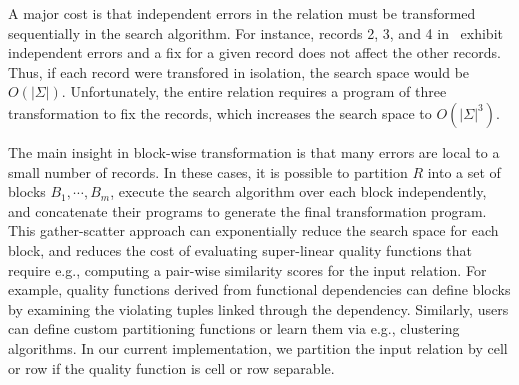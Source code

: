

A major cost is that independent errors in the relation must be transformed sequentially in the search algorithm.  For instance, records 2, 3, and 4 in~ exhibit independent errors and a fix for a given record does not affect the other records.  Thus, if each record were transfored in isolation, the search space would be $O(|\Sigma|)$.  Unfortunately, the entire relation requires a program of three transformation to fix the records, which increases the search space to $O(|\Sigma|^3)$.

The main insight in block-wise transformation is that many errors are local to a small number of records.  In these cases, it is possible to partition $R$ into a set of blocks $B_1,\cdots,B_m$, execute the search algorithm over each block independently, and concatenate their programs to generate the final transformation program.  This gather-scatter approach can exponentially reduce the search space for each block, and reduces the cost of evaluating super-linear quality functions that require e.g., computing a pair-wise similarity scores for the input relation.    For example, quality functions derived from functional dependencies can define blocks by examining the violating tuples linked through the dependency.  Similarly, users can define custom partitioning functions or learn them via e.g., clustering algorithms.  In our current implementation, we partition the input relation by cell or row if the quality function is cell or row separable.


